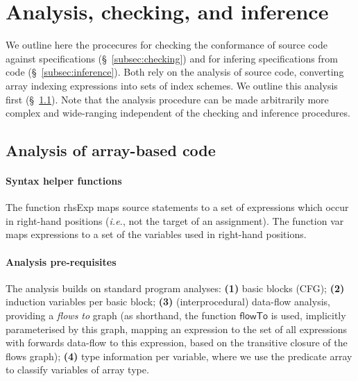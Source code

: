 \documentclass[10pt,preprint]{sigplanconf}
\newcounter{block}
\theoremstyle{definition}
\newcommand{\ie}{\emph{i.e.}}
\newcommand{\arrayTy}{\textsf{array}}
\newcommand{\rhsExp}{\textsf{rhsExp}}
\newcommand{\var}{\textsf{var}}
\begin{document}
\section{Analysis, checking, and inference}
\label{sec:analysis}

\noindent
We outline here the procecures for checking the conformance
of source code against specifications (\S~\ref{subsec:checking})
and for infering specifications from code (\S~\ref{subsec:inference}).
Both rely on the analysis of source code, converting array indexing
expressions into sets of index schemes. We outline this analysis
first (\S~\ref{subsec:analysis}). Note that the analysis procedure
can be made arbitrarily more complex and wide-ranging independent
of the checking and inference procedures.

\subsection{Analysis of array-based code}
\label{subsec:analysis}

\newcommand{\neigh}{\textsf{neigh}}

\paragraph{Syntax helper functions}
The function \rhsExp{} maps source statements to a
set of expressions which occur in right-hand positions (\ie{}, not the
target of an assignment). The function \var{} maps expressions to a
set of the variables used in right-hand positions.

\paragraph{Analysis pre-requisites}
The analysis builds on standard program analyses:
%
\textbf{(1)} basic blocks (CFG);
\textbf{(2)} induction variables per basic block;
\textbf{(3)} (interprocedural) data-flow analysis, providing a \emph{flows to}
  graph (as shorthand, the function
  $\mathsf{flowTo}$ is used, implicitly parameterised by this graph,
  mapping an expression to the set of all expressions
  with forwards data-flow to this expression, based on the transitive
  closure of the flows graph);
\textbf{(4)} type information per variable, where we use the predicate
\arrayTy{} to classify variables of array type.
\end{document}
